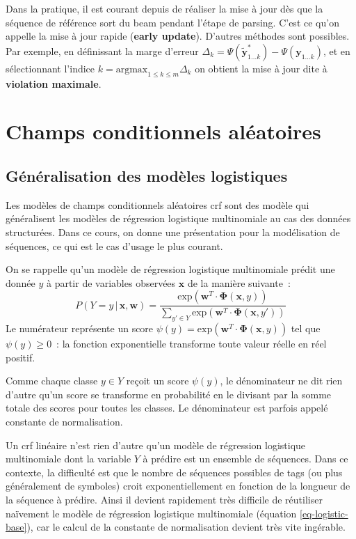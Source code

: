 \documentclass[11pt,openany]{book}
\newcommand{\ac}[1]{{\sc #1}} %
\newcommand{\kw}[1]{{\bf #1}} %
\begin{document}
Dans la pratique, il est courant depuis \cite{collins-2004} 
de réaliser la mise à jour dès que la séquence de référence sort du
beam pendant l'étape de parsing.
C'est ce qu'on appelle la mise à jour rapide (\kw{early update}).
D'autres méthodes sont possibles. Par exemple, en définissant la marge d'erreur
$\Delta_k =  \Psi(\tilde{\mathbf{y}}_{1\ldots k}^*) -
\Psi(\mathbf{y}_{1\ldots k})$, et en sélectionnant l'indice $k =
\text{argmax}_{1\leq k \leq m} \Delta_k$ on obtient la mise à jour
dite à \kw{violation maximale}. 



\chapter{Champs conditionnels aléatoires}

\section{Généralisation des modèles logistiques}

Les modèles de champs conditionnels aléatoires \ac{crf}
sont des modèle qui généralisent les modèles de régression logistique multinomiale au cas des données structurées.
Dans ce cours, on  donne une présentation pour la modélisation de séquences, ce qui est le cas d'usage le plus courant.

On se rappelle qu'un modèle de régression logistique multinomiale prédit une donnée $y$ à partir de variables observées $\mathbf{x}$ de la manière suivante~:
\begin{equation}
\label{eq-logistic-base}
P(Y = y \,|\, \mathbf{x},\mathbf{w}) = \frac{\text{exp}(\mathbf{w}^T \cdot \boldsymbol\Phi(\mathbf{x},y))}{\sum_{y'\in Y}\text{exp}(\mathbf{w}^T \cdot \boldsymbol\Phi(\mathbf{x},y'))}
\end{equation}
Le numérateur représente un score $\psi(y) = \text{exp}(\mathbf{w}^T \cdot \boldsymbol\Phi(\mathbf{x},y))$ tel que  $\psi(y) \geq 0$~: la fonction exponentielle transforme toute valeur réelle en  réel positif. 

Comme chaque classe $y\in Y$ reçoit un score $\psi(y)$,
le dénominateur ne dit rien d'autre qu'un score se transforme en probabilité en le divisant par la somme totale des scores pour toutes les classes. Le dénominateur est parfois appelé constante de normalisation.

Un \ac{crf} linéaire n'est rien d'autre qu'un modèle de régression logistique multinomiale dont la variable $Y$ à prédire est un ensemble de séquences. Dans ce contexte, la difficulté est que le nombre de séquences possibles de tags (ou plus généralement de symboles) croit exponentiellement en fonction de la longueur de la séquence à prédire.
Ainsi il devient rapidement très difficile de réutiliser naïvement le modèle de régression logistique multinomiale (équation \ref{eq-logistic-base}), car le calcul de la constante de normalisation devient très vite ingérable.
\end{document}
